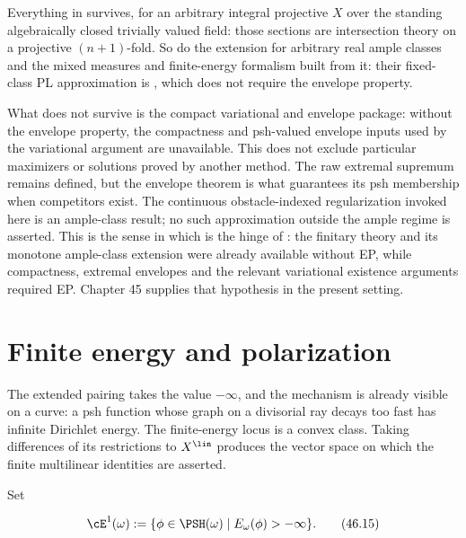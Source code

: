 \begin{remark}
\label{rem:ch46-without-envelope}
Everything in 
survives, for an arbitrary integral projective $X$ over the standing
algebraically closed trivially valued field: those sections are intersection theory on a
projective $(n+1)$-fold.  So do the extension
 for arbitrary real ample classes and
the mixed measures and finite-energy formalism built from it: their
fixed-class PL approximation is , which
does not require the envelope property.

What does not survive is the compact variational and envelope package:
without the envelope property, the compactness and psh-valued envelope
inputs used by the variational argument are unavailable. This does not
exclude particular maximizers or solutions proved by another method.
The raw extremal supremum remains defined, but the envelope theorem is
what guarantees its psh membership when competitors exist.
The continuous obstacle-indexed regularization invoked here is an
ample-class result; no such approximation outside the ample regime is
asserted. This is the
sense in which  is the hinge of
: the finitary theory and its monotone ample-class extension
were already available without EP, while compactness, extremal envelopes
and the relevant variational existence arguments required EP.
Chapter 45 supplies that hypothesis in the present setting.
\end{remark}

\section{Finite energy and polarization}
\label{sec:ch46-e1}

The extended pairing takes the value $-\infty$, and the mechanism is
already visible on a curve: a psh function whose graph on a divisorial ray
decays too fast has infinite Dirichlet energy.  The finite-energy locus is a convex class.  Taking differences of its
restrictions to $X^{\lin}$ produces the vector space on which the finite
multilinear identities are asserted.

\begin{definition}
\label{def:bj-e1}
Set

\[
 \cE^1(\omega)
 :=\{\phi\in\PSH(\omega)\mid E_\omega(\phi)>-\infty\}.
\tag{46.15}\label{eq:bj-e1-definition}
\]
\end{definition}

